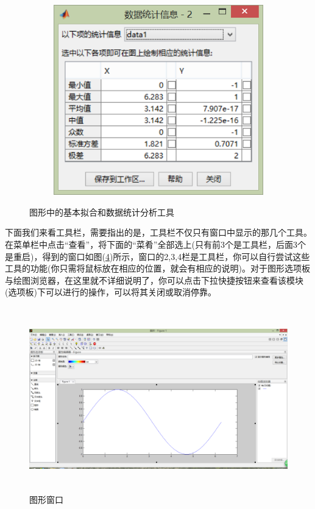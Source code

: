 \begin{figure}[H]
\begin{subfigure}[b]{0.2\textwidth}
            \caption{}
            \label{基本拟合}
        \end{subfigure}
        \begin{subfigure}[b]{0.4\textwidth}
            \includegraphics[width=\textwidth]{images/22.jpg}
            \caption{}
            \label{数据统计分析}
        \end{subfigure}
        \caption{图形中的基本拟合和数据统计分析工具}
        \label{图形中的基本拟合和数据统计分析工具}
        \end{figure}
        下面我们来看工具栏，需要指出的是，工具栏不仅只有窗口中显示的那几个工具。在菜单栏中点击“查看”，将下面的“菜肴”全部选上(只有前3个是工具栏，后面3个是重启)，得到的窗口如图(\ref{图形窗口})所示，窗口的2,3,4栏是工具栏，你可以自行尝试这些工具的功能(你只需将鼠标放在相应的位置，就会有相应的说明)。对于图形选项板与绘图浏览器，在这里就不详细说明了，你可以点击下拉快捷按钮来查看该模块(选项板)下可以进行的操作，可以将其关闭或取消停靠。
        \begin{figure}[H]
        \centering
        \includegraphics[height=8cm]{images/23.jpg}
        \caption{图形窗口}
        \label{图形窗口}
        \end{figure}
